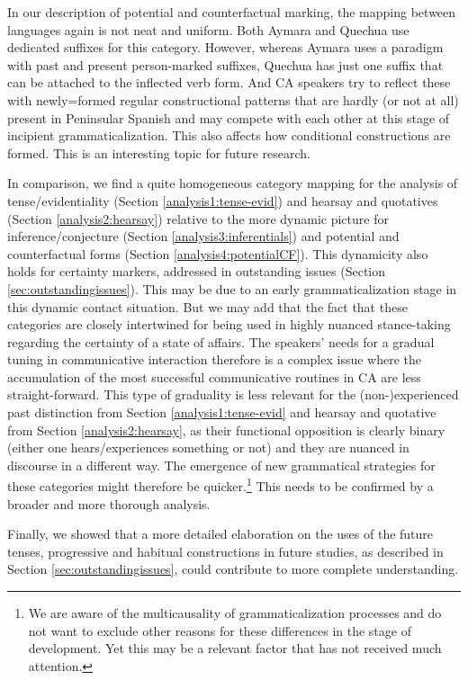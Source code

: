 \documentclass[output=paper,hidelinks]{langscibook}
\begin{document}
In our description of potential and counterfactual marking, the mapping between languages again is not neat and uniform. Both Aymara and Quechua use dedicated suffixes for this category. However, whereas Aymara uses a paradigm with past and present person-marked suffixes, Quechua has just one suffix that can be attached to the inflected verb form. And CA speakers try to reflect these with newly=formed regular constructional patterns that are hardly (or not at all) present in Peninsular Spanish and may compete with each other at this stage of incipient grammaticalization. This also affects how conditional constructions are formed. This is an interesting topic for future research. 

In comparison, we find a quite homogeneous category mapping for the analysis of tense/evidentiality (Section \ref{analysis1:tense-evid}) and hearsay and quotatives (Section \ref{analysis2:hearsay}) relative to the more dynamic picture for inference/conjecture (Section \ref{analysis3:inferentials}) and potential and counterfactual forms (Section \ref{analysis4:potentialCF}). This dynamicity also holds for certainty markers, addressed in outstanding issues (Section \ref{sec:outstandingissues}). This may be due to an early grammaticalization stage in this dynamic contact situation. But we may add that the fact that these categories are closely intertwined for being used in highly nuanced stance-taking regarding the certainty of a state of affairs. The speakers’ needs for a gradual tuning in communicative interaction therefore is a complex issue where the accumulation of the most successful communicative routines in CA are less straight-forward. This type of graduality is less relevant for the (non-)experienced past distinction from Section \ref{analysis1:tense-evid} and hearsay and quotative from Section \ref{analysis2:hearsay}, as their functional opposition is clearly binary (either one hears/experiences something or not) and they are nuanced in discourse in a different way. The emergence of new grammatical strategies for these categories might therefore be quicker.\footnote{We are aware of the multicausality of grammaticalization processes and do not want to exclude other reasons for these differences in the stage of development. Yet this may be a relevant factor that has not received much attention. } This needs to be confirmed by a broader and more thorough analysis.


Finally, we showed that a more detailed elaboration on the uses of the future tenses, progressive and habitual constructions in future studies, as described in Section \ref{sec:outstandingissues}, could contribute to more complete understanding.
\end{document}
